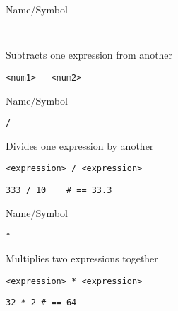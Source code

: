 \begin{desc}{Name/Symbol}
\item[Name/Symbol] \verb+-+

\item[Description]  Subtracts one expression from another

\item[Usage]        \verb!<num1> - <num2>!

\item[Example]     

\item[See Also]

\end{desc}




\begin{desc}{Name/Symbol}

\item[Name/Symbol] \verb+/+ 

\item[Description]  Divides one expression by another

\item[Usage]        \verb+<expression> / <expression>+ 

\item[Example]
\begin{verbatim}
333 / 10    # == 33.3
\end{verbatim}

\item[See Also]

\end{desc} 



\begin{desc}{Name/Symbol}
   

\item[Name/Symbol] \verb+*+

\item[Description]        Multiplies two expressions together

\item[Usage]       \verb+<expression> * <expression>+

\item[Example]
\begin{verbatim}
32 * 2 # == 64
\end{verbatim}

\item[See Also]     

\end{desc}




